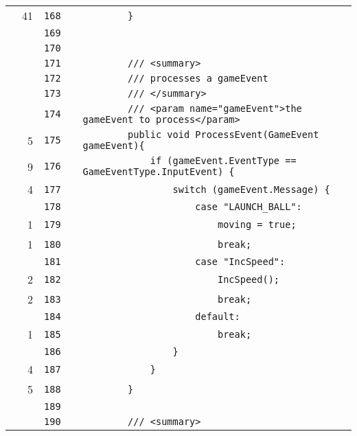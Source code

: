 \documentclass[a4paper,landscape,10pt]{article}
\begin{document}
\begin{longtable}[l]{lrrll}
\cellcolor{green} & 41 & \verb~168~ & & \verb~        }~\\
\cellcolor{gray} &  & \verb~169~ & & \verb~~\\
\cellcolor{gray} &  & \verb~170~ & & \verb~~\\
\cellcolor{gray} &  & \verb~171~ & & \verb~        /// <summary>~\\
\cellcolor{gray} &  & \verb~172~ & & \verb~        /// processes a gameEvent~\\
\cellcolor{gray} &  & \verb~173~ & & \verb~        /// </summary>~\\
\cellcolor{gray} &  & \verb~174~ & & \verb~        /// <param name="gameEvent">the gameEvent to process</param>~\\
\cellcolor{green} & 5 & \verb~175~ & & \verb~        public void ProcessEvent(GameEvent gameEvent){~\\
\cellcolor{green} & 9 & \verb~176~ & & \verb~            if (gameEvent.EventType == GameEventType.InputEvent) {~\\
\cellcolor{green} & 4 & \verb~177~ & & \verb~                switch (gameEvent.Message) {~\\
\cellcolor{gray} &  & \verb~178~ & & \verb~                    case "LAUNCH_BALL":~\\
\cellcolor{green} & 1 & \verb~179~ & & \verb~                        moving = true;~\\
\cellcolor{green} & 1 & \verb~180~ & & \verb~                        break;~\\
\cellcolor{gray} &  & \verb~181~ & & \verb~                    case "IncSpeed":~\\
\cellcolor{green} & 2 & \verb~182~ & & \verb~                        IncSpeed();~\\
\cellcolor{green} & 2 & \verb~183~ & & \verb~                        break;~\\
\cellcolor{gray} &  & \verb~184~ & & \verb~                    default:~\\
\cellcolor{green} & 1 & \verb~185~ & & \verb~                        break;~\\
\cellcolor{gray} &  & \verb~186~ & & \verb~                }~\\
\cellcolor{green} & 4 & \verb~187~ & & \verb~            }~\\
\cellcolor{green} & 5 & \verb~188~ & & \verb~        }~\\
\cellcolor{gray} &  & \verb~189~ & & \verb~~\\
\cellcolor{gray} &  & \verb~190~ & & \verb~        /// <summary>~\\

\end{longtable}
\end{document}
